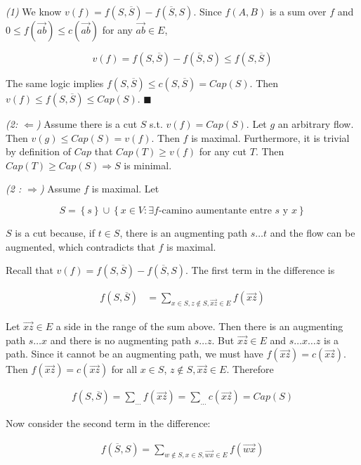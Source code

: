 \documentclass[a4paper, 12pt]{article}
\begin{document}
\textit{(1)} We know $v(f) = f(S, \overline{S}) - f(\overline{S}, S)$. Since
$f(A, B)$ is a sum over $f$ and $0 \leq f(\overrightarrow{ab}) \leq
c(\overrightarrow{ab})$ for any $\overrightarrow{ab} \in E$, 

$$v(f) = f(S, \overline{S}) - f(\overline{S}, S) \leq f(S, \overline{S})$$

The same logic implies $f(S, \overline{S}) \leq c(S, \overline{S}) = Cap(S)$.
Then $v(f) \leq f(S, \overline{S}) \leq Cap(S)$. $\blacksquare$

\textit{(2: $\Leftarrow$)} Assume there is a cut $S$ s.t. $v(f) = Cap(S)$. Let
$g$ an arbitrary flow. Then $v(g) \leq Cap(S) = v(f)$. Then $f$ is maximal.
Furthermore, it is trivial by definition of $Cap$ that $Cap(T) \geq v(f)$ for
any cut $T$. Then $Cap(T) \geq Cap(S) \Rightarrow S$ is minimal.

\textit{(2 : $\Rightarrow$)} Assume $f$ is maximal. Let

$$
S = \left\{ s \right\} \cup \left\{ x \in V : \exists f\text{-camino
aumentante entre $s$ y $x$} \right\} 
$$

$S$ is a cut because, if $t \in S$, there is an augmenting path 
$s \ldots t$ and the flow can be augmented, which contradicts 
that $f$ is maximal.

Recall that $v(f) = f(S, \overline{S}) - f(\overline{S},S)$. The first 
term in the difference is

\begin{align*}
    f(S, \overline{S}) &= \sum_{x \in S, z \not\in S, \overrightarrow{xz} \in E}
    f(\overrightarrow{xz})
\end{align*}

Let $\overrightarrow{xz} \in E$ a side in the range of the sum above.
Then there is an augmenting path $s \ldots x$ and there is no 
augmenting path $s \ldots z$. But $\overrightarrow{xz} \in E$ and 
$s\ldots x \ldots z$ is a path. Since it cannot be an augmenting path,
we must have $f(\overrightarrow{xz}) = c(\overrightarrow{xz})$. 
Then $f(\overrightarrow{xz}) = c(\overrightarrow{xz})$ for all $x \in S$, $z
\not\in S, \overrightarrow{xz}\in E$. Therefore

\begin{align*}
    f(S, \overline{S}) = \sum_{\ldots} f(\overrightarrow{xz}) = \sum_{\ldots}
    c(\overrightarrow{xz}) = Cap(S)
\end{align*}

Now consider the second term in the difference:

\begin{align*}
    f(\overline{S}, S) = \sum_{w \not\in S, x \in S, \overrightarrow{wx} \in E}
    f(\overrightarrow{wx})
\end{align*}
\end{document}
